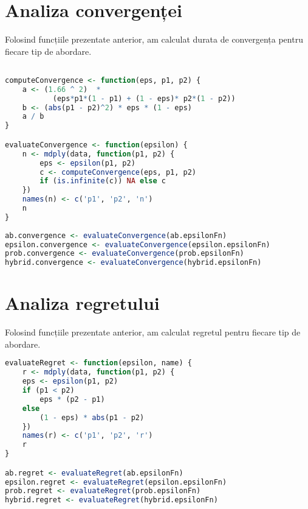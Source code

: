 \begin{appendices}
\break

\section{Analiza convergenței}

Folosind funcțiile prezentate anterior, am calculat durata de convergența pentru fiecare tip de abordare.

\begin{center}
	\begin{lstlisting}[language=r]

computeConvergence <- function(eps, p1, p2) {
	a <- (1.66 ^ 2)  * 
	       (eps*p1*(1 - p1) + (1 - eps)* p2*(1 - p2))
	b <- (abs(p1 - p2)^2) * eps * (1 - eps)
	a / b
}

evaluateConvergence <- function(epsilon) {
	n <- mdply(data, function(p1, p2) {
		eps <- epsilon(p1, p2)
		c <- computeConvergence(eps, p1, p2)
		if (is.infinite(c)) NA else c
	})
	names(n) <- c('p1', 'p2', 'n')
	n
}
	
ab.convergence <- evaluateConvergence(ab.epsilonFn)
epsilon.convergence <- evaluateConvergence(epsilon.epsilonFn)
prob.convergence <- evaluateConvergence(prob.epsilonFn)
hybrid.convergence <- evaluateConvergence(hybrid.epsilonFn)
	\end{lstlisting}
\end{center}

\section{Analiza regretului}

Folosind funcțiile prezentate anterior, am calculat regretul pentru fiecare tip de abordare.

\begin{center}
	\begin{lstlisting}[language=r]
evaluateRegret <- function(epsilon, name) {
	r <- mdply(data, function(p1, p2) {
	eps <- epsilon(p1, p2)
	if (p1 < p2) 
		eps * (p2 - p1) 
	else 
		(1 - eps) * abs(p1 - p2)
	})
	names(r) <- c('p1', 'p2', 'r')
	r
}

ab.regret <- evaluateRegret(ab.epsilonFn)
epsilon.regret <- evaluateRegret(epsilon.epsilonFn)
prob.regret <- evaluateRegret(prob.epsilonFn)
hybrid.regret <- evaluateRegret(hybrid.epsilonFn)

	\end{lstlisting}
\end{center}

\end{appendices}

